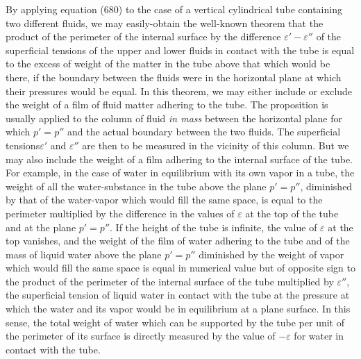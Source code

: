 \documentclass[12pt]{memoir}
\begin{document}
By applying equation (680) to the case of a vertical cylindrical tube containing two different fluids, we may easily-obtain the well-known theorem that the product of the perimeter of the internal surface by the difference $\varepsilon' - \varepsilon''$ of the superficial tensions of the upper and lower fluids in contact with the tube is equal to the excess of weight of the matter in the tube above that which would be there, if the boundary between the fluids were in the horizontal plane at which their pressures would be equal. In this theorem, we may either include or exclude the weight of a film of fluid matter adhering to the tube. The proposition is usually applied to the column of fluid \textit{in mass} between the horizontal plane for which $p '=p''$ and the actual boundary between the two fluids. The superficial tensions$\varepsilon'$ and $\varepsilon''$ are then to be measured in the vicinity of this column. But we may also include the weight of a film adhering to the internal surface of the tube. For example, in the case of water in equilibrium with its own vapor in a tube, the weight of all the water-substance in the tube above the plane $p' =p''$, diminished by that of the water-vapor which would fill the same space, is equal to the perimeter multiplied by the difference in the values of $\varepsilon$ at the top of the tube and at the plane $p' =p''$. If the height of the tube is infinite, the value of $\varepsilon$ at the top vanishes, and the weight of the film of water adhering to the tube and of the mass of liquid water above the plane $p' =p''$ diminished by the weight of vapor which would fill the same space is equal in numerical value but of opposite sign to the product of the perimeter of the internal surface of the tube multiplied by $\varepsilon''$, the superficial tension of liquid water in contact with the tube at the pressure at which the water and its vapor would be in equilibrium at a plane surface. In this sense, the total weight of water which can be supported by the tube per unit of the perimeter of its surface is directly measured by the value of $-\varepsilon$ for water in contact with the tube.
\end{document}
